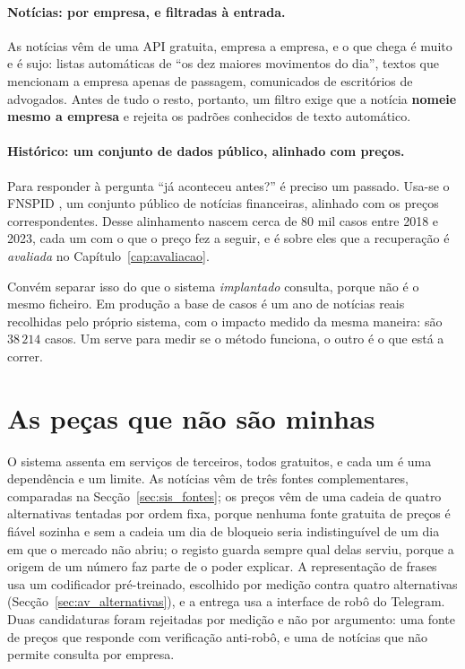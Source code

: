\paragraph{Notícias: por empresa, e filtradas à entrada.}
As notícias vêm de uma API gratuita, empresa a empresa, e o que chega é muito e é sujo: listas
automáticas de ``os dez maiores movimentos do dia'', textos que mencionam a empresa apenas de
passagem, comunicados de escritórios de advogados. Antes de tudo o resto, portanto, um filtro exige
que a notícia \textbf{nomeie mesmo a empresa} e rejeita os padrões conhecidos de texto automático.

\paragraph{Histórico: um conjunto de dados público, alinhado com preços.}
Para responder à pergunta ``já aconteceu antes?'' é preciso um passado. Usa-se o \gls{FNSPID}
\autocite{dong2024fnspid}, um conjunto público de notícias financeiras, alinhado com os preços
correspondentes. Desse alinhamento nascem cerca de 80 mil casos entre 2018 e 2023, cada um com o
que o preço fez a seguir, e é sobre eles que a recuperação é \emph{avaliada} no
Capítulo~\ref{cap:avaliacao}.

Convém separar isso do que o sistema \emph{implantado} consulta, porque não é o mesmo ficheiro. Em
produção a base de casos é um ano de notícias reais recolhidas pelo próprio sistema, com o impacto
medido da mesma maneira: são $38\,214$ casos. Um serve para medir se o método funciona, o outro é o que
está a correr.

\section{As peças que não são minhas}
\label{sec:sis_pecas}

O sistema assenta em serviços de terceiros, todos gratuitos, e cada um é uma dependência e um
limite. As notícias vêm de três fontes complementares, comparadas na Secção~\ref{sec:sis_fontes};
os preços vêm de uma cadeia de quatro alternativas tentadas por ordem fixa, porque nenhuma fonte
gratuita de preços é fiável sozinha e sem a cadeia um dia de bloqueio seria indistinguível de um
dia em que o mercado não abriu; o registo guarda sempre qual delas serviu, porque a origem de um
número faz parte de o poder explicar. A representação de frases usa um codificador pré-treinado,
escolhido por medição contra quatro alternativas (Secção~\ref{sec:av_alternativas}), e a entrega
usa a interface de robô do Telegram. Duas candidaturas foram rejeitadas por medição e não por
argumento: uma fonte de preços que responde com verificação anti-robô, e uma de notícias que não
permite consulta por empresa.

